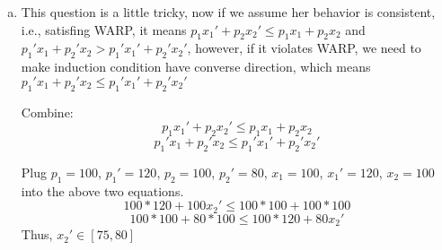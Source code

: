 \documentclass[11pt]{article} %
\begin{document}
\begin{enumerate}[(a)]
    \item 
        This question is a little tricky, now if we assume her behavior is consistent, i.e., satisfing WARP, it means 
        $p_1x_1'+p_2x_2' \leq p_1x_1+p_2x_2$ and $p_1'x_1+p_2'x_2> p_1'x_1'+p_2'x_2'$, however, if it violates WARP, we need to make induction condition have converse direction, 
        which means $p_1'x_1+p_2'x_2 \leq p_1'x_1'+p_2'x_2'$
        
        Combine:
        \begin{equation}
            p_1x_1'+p_2x_2' \leq p_1x_1+p_2x_2 
        \end{equation}
        \begin{equation}
            p_1'x_1+p_2'x_2 \leq p_1'x_1'+p_2'x_2'
        \end{equation}

        Plug $p_1=100$, $p_1'=120$, $p_2=100$, $p_2'=80$, $x_1=100$, $x_1'=120$, $x_2=100$ into the above two equations.
        \begin{equation*}
            100*120+100x_2'\leq 100*100+100*100
        \end{equation*}
        \begin{equation*}
            100*100+80*100\leq 100*120+80x_2'
        \end{equation*}
Thus, $x_2'\in [75,80]$


\end{enumerate}
\end{document}
